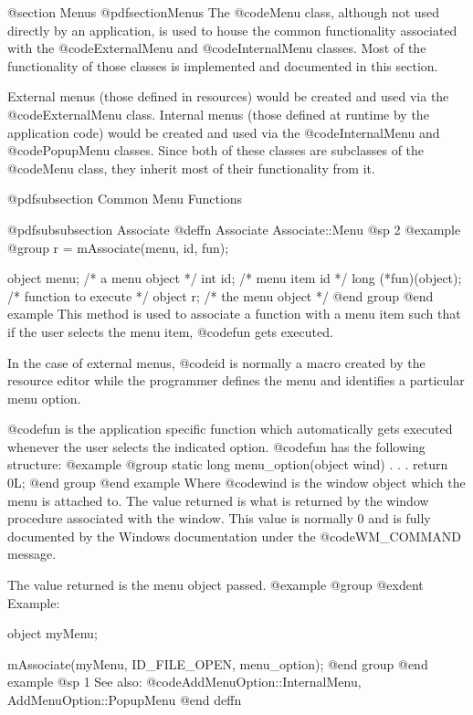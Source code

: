 @section Menus
@pdfsection{Menus}
The @code{Menu} class, although not used directly by an application, is
used to house the common functionality associated with the
@code{ExternalMenu} and @code{InternalMenu} classes.  Most of the
functionality of those classes is implemented and documented in this
section.

External menus (those defined in resources) would be created and used
via the @code{ExternalMenu} class.  Internal menus (those defined at runtime
by the application code) would be created and used via the
@code{InternalMenu} and @code{PopupMenu} classes.  Since both of these
classes are subclasses of the @code{Menu} class, they inherit most of
their functionality from it.






@pdfsubsection {Common Menu Functions}

@pdfsubsubsection {Associate}
@deffn {Associate} Associate::Menu
@sp 2
@example
@group
r = mAssociate(menu, id, fun);

object  menu;   /*  a menu object     */
int     id;     /*  menu item id      */
long    (*fun)(object);  /*  function to execute  */
object  r;      /*  the menu object   */
@end group
@end example
This method is used to associate a function with a menu item such that if
the user selects the menu item, @code{fun} gets executed.

In the case of external menus, @code{id} is normally a macro created by
the resource editor while the programmer defines the menu and identifies
a particular menu option.

@code{fun} is the application specific function which automatically gets
executed whenever the user selects the indicated option.  @code{fun} has
the following structure:
@example
@group
static  long    menu_option(object wind)
{
           .
           .
           .
        return 0L;
}
@end group
@end example
Where @code{wind} is the window object which the menu is attached to.
The value returned is what is returned by the window procedure associated
with the window.  This value is normally 0 and is fully documented by
the Windows documentation under the @code{WM_COMMAND} message.

The value returned is the menu object passed.
@example
@group
@exdent Example:

object  myMenu;

mAssociate(myMenu, ID_FILE_OPEN, menu_option);
@end group
@end example
@sp 1
See also:  @code{AddMenuOption::InternalMenu, AddMenuOption::PopupMenu}
@end deffn








